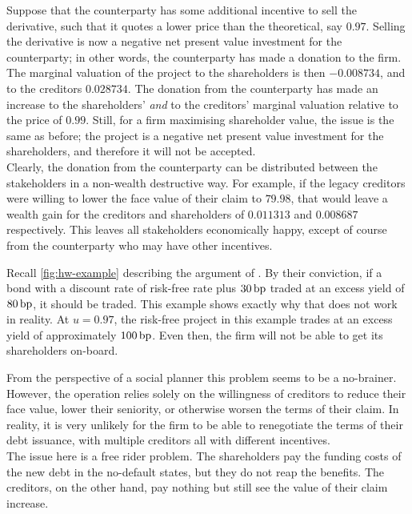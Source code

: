 \documentclass[main.tex]{subfiles}
\begin{document}
        Suppose that the counterparty has some additional incentive to sell the derivative,
        such that it quotes a lower price than the theoretical, say $\num{0.97}$.
        Selling the derivative is now a negative net present value investment for the counterparty;
        in other words, the counterparty has made a donation to the firm. 
        The marginal valuation of the project to the shareholders is then $\num{-0.008734}$,
        and to the creditors $\num{0.028734}$.
        The donation from the counterparty has made an increase to the shareholders' 
        \textit{and} to the creditors' marginal valuation relative to the price of $\num{0.99}$.
        Still, for a firm maximising shareholder value, the issue is the same as before;
        the project is a negative net present value investment for the shareholders,
        and therefore it will not be accepted.
        \\
        Clearly, the donation from the counterparty can be distributed between the 
        stakeholders in a non-wealth destructive way. 
        For example, if the legacy creditors were willing to lower the face value of their claim
        to $\num{79.98}$, that would leave a wealth gain for the creditors and shareholders
        of $\num{0.011313}$ and $\num{0.008687}$ respectively.
        This leaves all stakeholders economically happy, 
        except of course from the counterparty who may have other incentives.

        Recall \cref{fig:hw-example} describing the argument of \textcite{HullWhite2012FVA}.
        By their conviction, if a bond with a discount rate of risk-free rate plus $30\,\text{bp}$ 
        traded at an excess yield of $80\,\text{bp}$, it should be traded. 
        This example shows exactly why that does not work in reality.
        At $u=\num{0.97}$, the risk-free project in this example trades at 
        an excess yield of approximately $100\,\text{bp}$.
        Even then, the firm will not be able to get its shareholders on-board.

        From the perspective of a social planner this problem seems to be a no-brainer. 
        However, the operation relies solely on the willingness of creditors to 
        reduce their face value, lower their seniority, or otherwise worsen the terms of their claim.
        In reality, it is very unlikely for the firm to be able to renegotiate 
        the terms of their debt issuance, with multiple creditors all with different incentives.
        \\
        The issue here is a free rider problem. 
        The shareholders pay the funding costs of the new debt in the no-default states,
        but they do not reap the benefits.
        The creditors, on the other hand, pay nothing 
        but still see the value of their claim increase.
\end{document}
